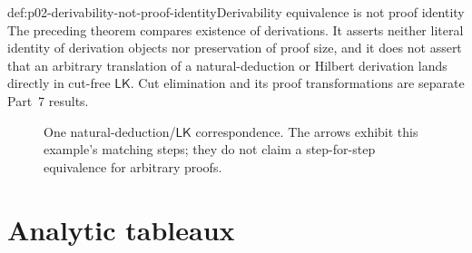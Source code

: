 \begin{hbwarning}{def:p02-derivability-not-proof-identity}{Derivability equivalence is not proof identity}
The preceding theorem compares existence of derivations.  It asserts neither
literal identity of derivation objects nor preservation of proof size, and it
does not assert that an arbitrary translation of a natural-deduction or
Hilbert derivation lands directly in cut-free \(\mathsf{LK}\).  Cut
elimination and its proof transformations are separate Part~7 results.
\end{hbwarning}

\begin{figure}[htbp]
\centering
{}
\caption{One natural-deduction/\(\mathsf{LK}\) correspondence.
The arrows exhibit this example's matching steps; they do not claim a
step-for-step equivalence for arbitrary proofs.}
\label{fig:p02-nd-lk-correspondence}
\end{figure}

\section{Analytic tableaux}
\label{sec:p02-analytic-tableaux}

